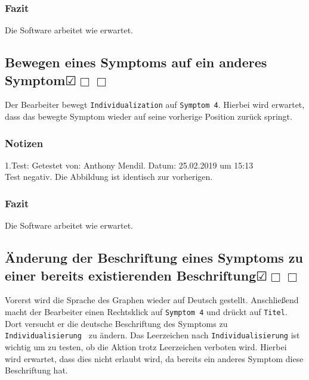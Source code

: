 \documentclass{scrartcl}
\newcommand{\subsectiont}[2]{\subsection[#1]{#1{\normalsize\normalfont #2}}}
\newcommand{\leer}{$\Box$}
\newcommand{\ok}{$\CheckedBox$}
\begin{document}
\subsubsection{Fazit}
Die Software arbeitet wie erwartet.

\subsectiont{Bewegen eines Symptoms auf ein anderes Symptom}{\dotfill\ok\leer\leer} 
Der Bearbeiter bewegt \texttt{Individualization} auf \texttt{Symptom 4}. Hierbei wird erwartet, dass das bewegte Symptom wieder auf seine vorherige Position zurück springt. 
\subsubsection{Notizen}
1.Test: Getestet von: Anthony Mendil. Datum: 25.02.2019 um 15:13 \\
Test negativ. Die Abbildung ist identisch zur vorherigen. 
\subsubsection{Fazit}
Die Software arbeitet wie erwartet.

\subsectiont{Änderung der Beschriftung eines Symptoms zu einer bereits existierenden Beschriftung}{\dotfill\ok\leer\leer}
Vorerst wird die Sprache des Graphen wieder auf Deutsch gestellt. Anschließend macht der Bearbeiter einen Rechtsklick auf \texttt{Symptom 4} und drückt auf \texttt{Titel}. Dort versucht er die deutsche Beschriftung des Symptoms zu \texttt{Individualisierung } zu ändern. Das Leerzeichen nach \texttt{Individualisierung} ist wichtig um zu testen, ob die Aktion trotz Leerzeichen verboten wird. Hierbei wird erwartet, dass dies nicht erlaubt wird, da bereits ein anderes Symptom diese Beschriftung hat. 
\end{document}

